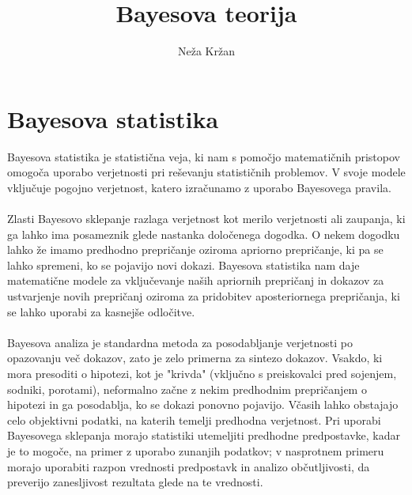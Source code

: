 \documentclass[12pt,a4paper]{amsart}
\theoremstyle{definition} %
\theoremstyle{plain} %
\begin{document}
\title{Bayesova teorija}
\author{Neža Kržan}
\maketitle

\section{Bayesova statistika}
Bayesova statistika je statistična veja, ki nam s pomočjo matematičnih pristopov omogoča uporabo verjetnosti pri reševanju statističnih 
problemov. V svoje modele vključuje pogojno verjetnost, katero izračunamo z uporabo Bayesovega pravila. \\\\
Zlasti Bayesovo sklepanje razlaga verjetnost kot merilo verjetnosti ali zaupanja, ki ga lahko ima posameznik glede nastanka določenega dogodka. 
O nekem dogodku lahko že imamo predhodno prepričanje oziroma apriorno prepričanje, ki pa se lahko spremeni, ko se pojavijo novi dokazi. Bayesova 
statistika nam daje matematične modele za vključevanje naših apriornih prepričanj in dokazov za ustvarjenje novih prepričanj oziroma za 
pridobitev aposteriornega prepričanja, ki se lahko uporabi za kasnejše odločitve.\\\\
Bayesova analiza je standardna metoda za posodabljanje verjetnosti po opazovanju več dokazov, zato je zelo primerna za sintezo dokazov.
Vsakdo, ki mora presoditi o hipotezi, kot je "krivda" (vključno s preiskovalci pred sojenjem, sodniki, porotami), neformalno začne z nekim 
predhodnim prepričanjem o hipotezi in ga posodablja, ko se dokazi ponovno pojavijo. Včasih lahko obstajajo celo objektivni podatki, na katerih temelji 
predhodna verjetnost. Pri uporabi Bayesovega sklepanja morajo statistiki utemeljiti predhodne predpostavke, kadar je to mogoče, na primer z 
uporabo zunanjih podatkov; v nasprotnem primeru morajo uporabiti razpon vrednosti predpostavk in analizo občutljivosti, da preverijo zanesljivost rezultata 
glede na te vrednosti.

\end{document}
